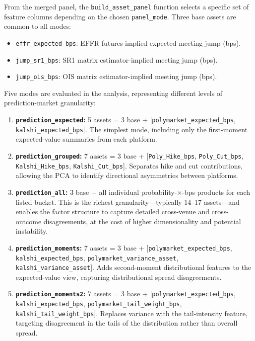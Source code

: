 From the merged panel, the \texttt{build\_asset\_panel} function selects a specific set of feature columns depending on the chosen \texttt{panel\_mode}. Three base assets are common to all modes:
\begin{itemize}
    \item \texttt{effr\_expected\_bps}: EFFR futures-implied expected meeting jump (bps).
    \item \texttt{jump\_sr1\_bps}: SR1 matrix estimator-implied meeting jump (bps).
    \item \texttt{jump\_ois\_bps}: OIS matrix estimator-implied meeting jump (bps).
\end{itemize}

Five modes are evaluated in the analysis, representing different levels of prediction-market granularity:

\begin{enumerate}
    \item \textbf{\texttt{prediction\_expected}:} 5 assets = 3 base + [\texttt{polymarket\_expected\_bps}, \texttt{kalshi\_expected\_bps}]. The simplest mode, including only the first-moment expected-value summaries from each platform.
    \item \textbf{\texttt{prediction\_grouped}:} 7 assets = 3 base + [\texttt{Poly\_Hike\_bps}, \texttt{Poly\_Cut\_bps}, \texttt{Kalshi\_Hike\_bps}, \texttt{Kalshi\_Cut\_bps}]. Separates hike and cut contributions, allowing the PCA to identify directional asymmetries between platforms.
    \item \textbf{\texttt{prediction\_all}:} 3 base + all individual probability-$\times$-bps products for each listed bucket. This is the richest granularity---typically 14--17 assets---and enables the factor structure to capture detailed cross-venue and cross-outcome disagreements, at the cost of higher dimensionality and potential instability.
    \item \textbf{\texttt{prediction\_moments}:} 7 assets = 3 base + [\texttt{polymarket\_expected\_bps}, \texttt{kalshi\_expected\_bps}, \texttt{polymarket\_variance\_asset}, \texttt{kalshi\_variance\_asset}]. Adds second-moment distributional features to the expected-value view, capturing distributional spread disagreements.
    \item \textbf{\texttt{prediction\_moments2}:} 7 assets = 3 base + [\texttt{polymarket\_expected\_bps}, \texttt{kalshi\_expected\_bps}, \texttt{polymarket\_tail\_weight\_bps}, \texttt{kalshi\_tail\_weight\_bps}]. Replaces variance with the tail-intensity feature, targeting disagreement in the tails of the distribution rather than overall spread.
\end{enumerate}

